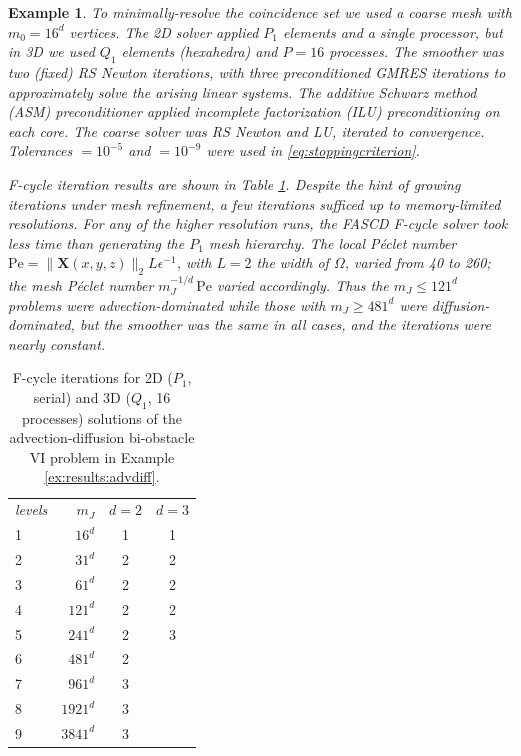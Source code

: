 \documentclass[letterpaper,final,12pt,reqno]{amsart}
\theoremstyle{cstyle}
\theoremstyle{cstyle*}
\theoremstyle{dstyle}
\newtheorem{example}[theorem]{Example}
\numberwithin{equation}{section}
\numberwithin{figure}{section}
\numberwithin{table}{section}
\numberwithin{theorem}{section}
\newcommand{\eps}{\epsilon}
\newcommand{\bX}{\mathbf{X}}
\begin{document}
\begin{example}
To minimally-resolve the coincidence set we used a coarse mesh with $m_0=16^d$ vertices.  The 2D solver applied $P_1$ elements and a single processor, but in 3D we used $Q_1$ elements (hexahedra) and $P=16$ processes.  The smoother was two (fixed) RS Newton iterations,  with three preconditioned GMRES iterations to approximately solve the arising linear systems.  The additive Schwarz method (ASM) preconditioner applied incomplete factorization (ILU) preconditioning on each core.  The coarse solver was RS Newton and LU, iterated to convergence.  Tolerances  $=10^{-5}$ and  $=10^{-9}$ were used in \eqref{eq:stoppingcriterion}.

F-cycle iteration results are shown in Table \ref{tab:results:advdiff}.  Despite the hint of growing iterations under mesh refinement, a few iterations sufficed up to memory-limited resolutions.  For any of the higher resolution runs, the FASCD F-cycle solver took less time than generating the $P_1$ mesh hierarchy.  The local Péclet number $\text{Pe}=\|\bX(x,y,z)\|_2 L \eps^{-1}$, with $L=2$ the width of $\Omega$, varied from 40 to 260; the mesh Péclet number $m_J^{-1/d}\,\text{Pe}$ varied accordingly.  Thus the $m_J\le 121^d$ problems were advection-dominated while those with $m_J\ge 481^d$ were diffusion-dominated, but the smoother was the same in all cases, and the iterations were nearly constant.
\end{example}

\begin{table}[ht]
\begin{tabular}{lr@{\hskip 7mm}c@{\hskip 4mm}c}
\emph{levels} & $m_J$ & $d=2$ & $d=3$ \\ \cmidrule{1-4}
 1 &    $16^d$ & 1 & 1 \\
 2 &    $31^d$ & 2 & 2 \\
 3 &    $61^d$ & 2 & 2 \\
 4 &   $121^d$ & 2 & 2 \\
 5 &   $241^d$ & 2 & 3 \\
 6 &   $481^d$ & 2 \\
 7 &   $961^d$ & 3 \\
 8 &  $1921^d$ & 3 \\
 9 &  $3841^d$ & 3
\end{tabular}
\bigskip
\caption{F-cycle iterations for 2D ($P_1$, serial) and 3D ($Q_1$, 16 processes) solutions of the advection-diffusion bi-obstacle VI problem in Example \ref{ex:results:advdiff}.}
\label{tab:results:advdiff}
\end{table}
\end{document}
